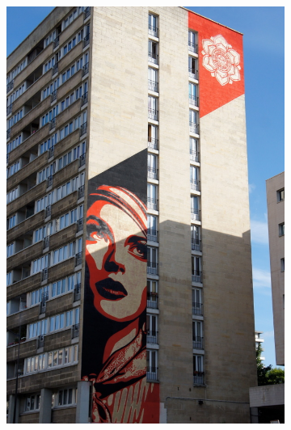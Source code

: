 \begin{figure}[b]
    \begin{subfigure}[t]{0.102\textwidth}
        \centering
        \includegraphics[width=\textwidth]{images/pair_example1}
    \end{subfigure}%
		\enspace %
    \begin{subfigure}[t]{0.102\textwidth}
        \centering

\end{subfigure}
\end{figure}
